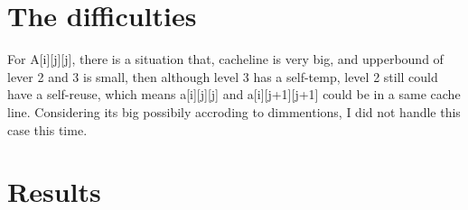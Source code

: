 \section{The difficulties}
For A[i][j][j], there is a situation that, cacheline is very big, and
upperbound of lever 2 and 3 is small, then although level 3 has a
self-temp, level 2 still could have a self-reuse, which means
a[i][j][j] and a[i][j+1][j+1] could be in a same cache line.
Considering its big possibily accroding to dimmentions, I did not
handle this case this time. 


\newpage
\section{Results}
